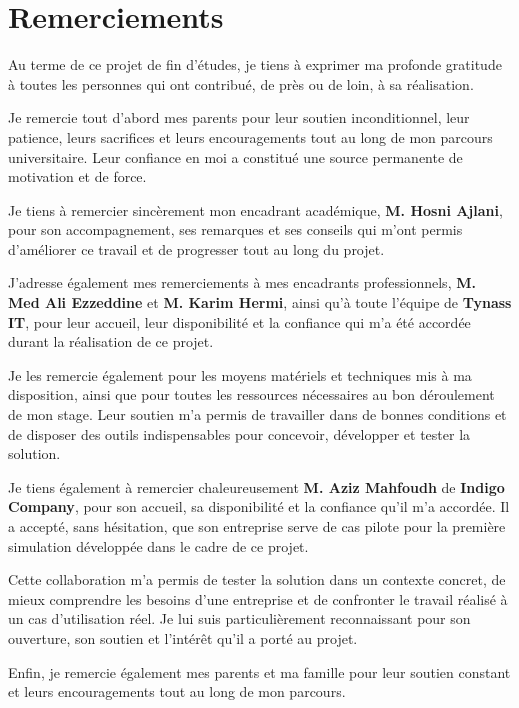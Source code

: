 \chapter*{Remerciements}

\vspace{1cm}

Au terme de ce projet de fin d'études, je tiens à exprimer ma profonde gratitude
à toutes les personnes qui ont contribué, de près ou de loin, à sa réalisation.

Je remercie tout d'abord mes parents pour leur soutien inconditionnel, leur patience,
leurs sacrifices et leurs encouragements tout au long de mon parcours universitaire.
Leur confiance en moi a constitué une source permanente de motivation et de force.

Je tiens à remercier sincèrement mon encadrant académique,
\textbf{M. Hosni Ajlani}, pour son accompagnement, ses remarques et ses conseils
qui m'ont permis d'améliorer ce travail et de progresser tout au long du projet.

J'adresse également mes remerciements à mes encadrants professionnels,
\textbf{M. Med Ali Ezzeddine} et \textbf{M. Karim Hermi}, ainsi qu'à toute l'équipe
de \textbf{Tynass IT}, pour leur accueil, leur disponibilité et la confiance qui m'a été
accordée durant la réalisation de ce projet.

Je les remercie également pour les moyens matériels et techniques mis à ma disposition,
ainsi que pour toutes les ressources nécessaires au bon déroulement de mon stage.
Leur soutien m'a permis de travailler dans de bonnes conditions et de disposer
des outils indispensables pour concevoir, développer et tester la solution.

Je tiens également à remercier chaleureusement
\textbf{M. Aziz Mahfoudh} de \textbf{Indigo Company},
pour son accueil, sa disponibilité et la confiance qu'il m'a accordée.
Il a accepté, sans hésitation, que son entreprise serve de cas pilote pour la première
simulation développée dans le cadre de ce projet.

Cette collaboration m'a permis de tester la solution dans un contexte concret,
de mieux comprendre les besoins d'une entreprise et de confronter le travail réalisé
à un cas d'utilisation réel. Je lui suis particulièrement reconnaissant pour son ouverture,
son soutien et l'intérêt qu'il a porté au projet.

Enfin, je remercie également mes parents et ma famille pour leur soutien constant
et leurs encouragements tout au long de mon parcours.

\clearpage
